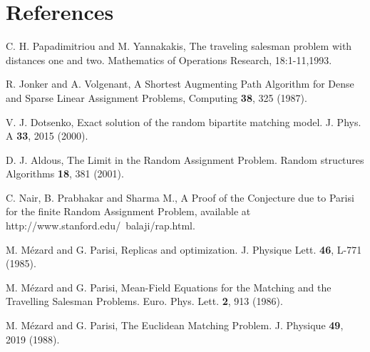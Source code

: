 \documentclass[]{iopart}
\begin{document}
\section*{References}
\begin{thebibliography}{99}
 {C. H. Papadimitriou and M. Yannakakis,
 The traveling salesman problem with distances one and two.
 {Mathematics of Operations Research}, 18:1-11,1993.}


 {R. Jonker  and  A. Volgenant,
  A Shortest Augmenting Path
      Algorithm for Dense and Sparse Linear  Assignment Problems,
 { Computing } {\bf 38}, 325 (1987).}



 { V. J. Dotsenko,
Exact solution of the random  bipartite matching model. 
{ J. Phys. A} {\bf 33}, 2015 (2000).}

 {D. J. Aldous,
The  Limit in the Random Assignment Problem.
 Random structures Algorithms {\bf 18}, 381 (2001).}


{ C. Nair, B. Prabhakar and Sharma M.,  A Proof of the
 Conjecture due to Parisi for the finite Random Assignment Problem,
available at http://www.stanford.edu/~balaji/rap.html.}

{ M. M\'ezard and G. Parisi,
Replicas and optimization. 
{ J. Physique Lett.} {\bf 46}, L-771 (1985).}

{ M. M\'ezard and G. Parisi,
Mean-Field Equations for the Matching
 and the Travelling Salesman Problems.
 { Euro. Phys. Lett.} {\bf 2}, 913 (1986).}

{ M. M\'ezard and G. Parisi,
 The Euclidean Matching Problem.
 { J. Physique} {\bf 49}, 2019 (1988).}



\end{thebibliography}
\end{document}
